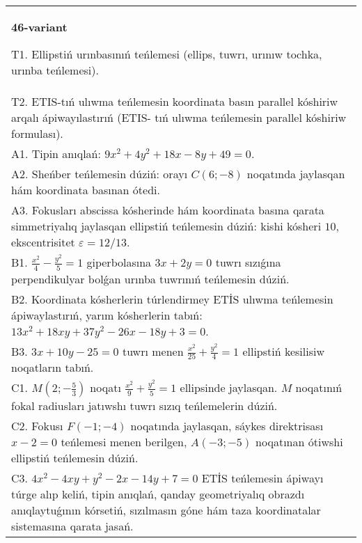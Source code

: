 \documentclass{article}
\begin{document}
\begin{tabular}{m{17cm}}
\textbf{46-variant}
\newline

T1. Ellipstiń urınbasınıń teńlemesi (ellips, tuwrı, urınıw tochka, urınba teńlemesi).\\

T2. ETIS-tıń ulıwma teńlemesin koordinata basın parallel kóshiriw arqalı ápiwayılastırıń (ETIS- tıń ulıwma teńlemesin parallel kóshiriw formulası).\\

A1. Tipin anıqlań: $9 x^{2}+4 y^{2}+18 x-8 y+49=0$.\\

A2. Sheńber teńlemesin dúziń: orayı $C (6 ;-8) $ noqatında jaylasqan hám koordinata basınan ótedi.\\

A3. Fokusları abscissa kósherinde hám koordinata basına qarata simmetriyalıq jaylasqan ellipstiń teńlemesin dúziń: kishi kósheri $10$, ekscentrisitet $\varepsilon=12/13$.\\

B1. $\frac{x^{2}}{4} - \frac{y^{2}}{5} = 1$ giperbolasına $3x + 2y = 0$ tuwrı sızıǵına perpendikulyar bolǵan urınba tuwrınıń teńlemesin dúziń.\\

B2. Koordinata kósherlerin túrlendirmey ETİS ulıwma teńlemesin ápiwaylastırıń, yarım kósherlerin tabıń: $13x^{2} + 18xy + 37y^{2} - 26x - 18y + 3 = 0$.  \\

B3. $3x + 10y - 25 = 0$ tuwrı menen $\frac{x^{2}}{25} + \frac{y^{2}}{4} = 1$ ellipstiń kesilisiw noqatların tabıń.\\

C1. $M(2; - \frac{5}{3})$ noqatı $\frac{x^{2}}{9} + \frac{y^{2}}{5} = 1$ ellipsinde jaylasqan. $M$ noqatınıń fokal radiusları jatıwshı tuwrı sızıq teńlemelerin dúziń.  \\

C2. Fokusı $F( - 1; - 4)$ noqatında jaylasqan, sáykes direktrisası $x - 2 = 0$ teńlemesi menen berilgen, $A( - 3; - 5)$ noqatınan ótiwshi ellipstiń teńlemesin dúziń.  \\

C3. $4x^{2} - 4xy + y^{2} - 2x - 14y + 7 = 0$ ETİS teńlemesin ápiwayı túrge alıp keliń, tipin anıqlań, qanday geometriyalıq obrazdı anıqlaytuǵının kórsetiń, sızılmasın góne hám taza koordinatalar sistemasına qarata jasań.  \\

\end{tabular}
\vspace{1cm}
\end{document}
